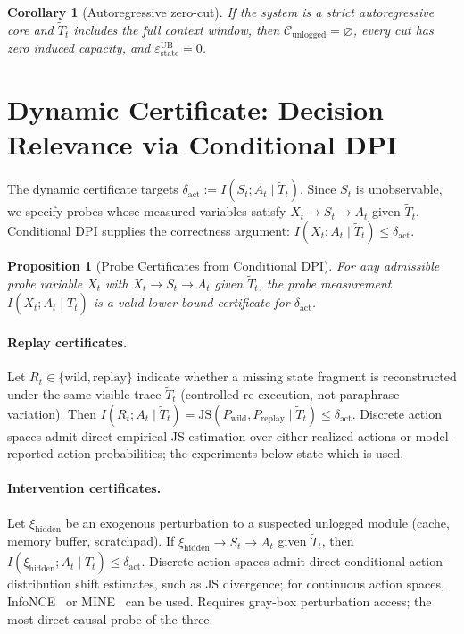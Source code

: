 \documentclass{article}
\newtheorem{proposition}{Proposition}
\newtheorem{corollary}{Corollary}
\begin{document}
\begin{corollary}[Autoregressive zero-cut]
\label{cor:auto-exact}
If the system is a strict autoregressive core and $\tilde T_t$ includes the full context window, then $\mathcal{C}_\text{unlogged} = \varnothing$, every cut has zero induced capacity, and $\varepsilon_\text{state}^\text{UB} = 0$.
\end{corollary}

\section{Dynamic Certificate: Decision Relevance via Conditional DPI}
\label{sec:dynamic-cert}

The dynamic certificate targets $\delta_\text{act} := I(S_t; A_t \mid \tilde T_t)$. Since $S_t$ is unobservable, we specify probes whose measured variables satisfy $X_t \to S_t \to A_t$ given $\tilde T_t$. Conditional DPI supplies the correctness argument: $I(X_t; A_t \mid \tilde T_t) \leq \delta_\text{act}$.

\begin{proposition}[Probe Certificates from Conditional DPI]
\label{prop:dynamic-lb}
For any admissible probe variable $X_t$ with $X_t \to S_t \to A_t$ given $\tilde T_t$, the probe measurement $I(X_t; A_t \mid \tilde T_t)$ is a valid lower-bound certificate for $\delta_\text{act}$.
\end{proposition}

\paragraph{Replay certificates.}
\label{sec:replay-cert}
Let $R_t \in \{\text{wild}, \text{replay}\}$ indicate whether a missing state fragment is reconstructed under the same visible trace $\tilde T_t$ (controlled re-execution, not paraphrase variation). Then $I(R_t; A_t \mid \tilde T_t) = \mathrm{JS}(P_\text{wild}, P_\text{replay} \mid \tilde T_t) \leq \delta_\text{act}$.  Discrete action spaces admit direct empirical JS estimation over either realized actions or model-reported action probabilities; the experiments below state which is used.

\paragraph{Intervention certificates.}
Let $\xi_\text{hidden}$ be an exogenous perturbation to a suspected unlogged module (cache, memory buffer, scratchpad). If $\xi_\text{hidden} \to S_t \to A_t$ given $\tilde T_t$, then $I(\xi_\text{hidden}; A_t \mid \tilde T_t) \leq \delta_\text{act}$. Discrete action spaces admit direct conditional action-distribution shift estimates, such as JS divergence; for continuous action spaces, InfoNCE~\citep{oord2018cpc} or MINE~\citep{belghazi2018mine} can be used. Requires gray-box perturbation access; the most direct causal probe of the three.
\end{document}

